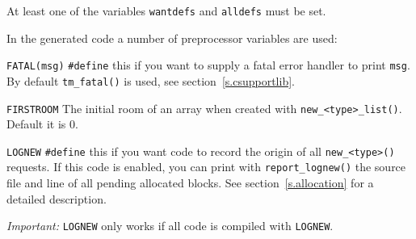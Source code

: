 At least one of the variables \texttt{wantdefs} and \texttt{alldefs}
must be set.

In the generated {\C} code a number of preprocessor variables are used:

\begin{desctab}
\item[\texttt{FATAL(msg)}]
\texttt{\#define} this if you want to supply a fatal error handler to print
\texttt{msg}.
By default \verb'tm_fatal()' is used,
see section~\ref{s.csupportlib}.

\item[\texttt{FIRSTROOM}]
The initial room of an array when created with \verb+new_<type>_list()+.
Default it is 0.

\item[\texttt{LOGNEW}]
\texttt{\#define} this if you want code to record the origin of all
\verb+new_<type>()+ requests.
If this code is enabled, you can print with \verb+report_lognew()+ the
source file and line of all pending allocated blocks.
See section~\ref{s.allocation} for a detailed description.

\emph{Important:} \texttt{LOGNEW} only works if all code is compiled
with \texttt{LOGNEW}.
\end{desctab}
